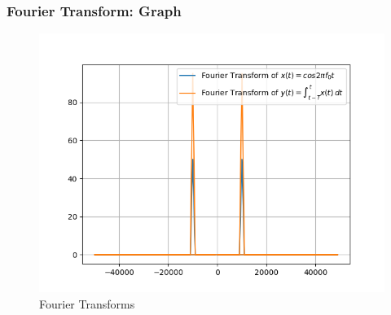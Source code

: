 \documentclass{beamer}
\begin{document}
\begin{frame}
    \frametitle {Fourier Transform: Graph}
    \begin{flushleft}
    \begin{figure}[!ht]
\centering
 \includegraphics[width=\columnwidth]{graphs/fourier.png}
 \caption{Fourier Transforms}
 \end{figure}
    \end{flushleft}
\end{frame}
\end{document}
